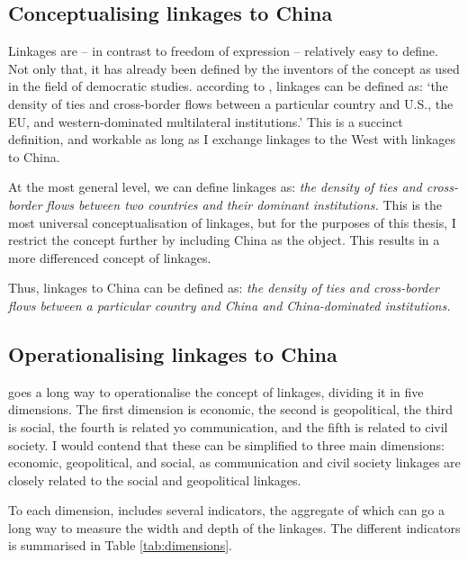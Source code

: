 \subsection{Conceptualising linkages to China}
Linkages are -- in contrast to freedom of expression -- relatively easy to define. Not only that, it has already been defined by the inventors of the concept as used in the field of democratic studies. according to \citet[pp. 383-384]{levitsky_linkage_2006}, linkages can be defined as: `the density of ties and cross-border flows between a particular country and U.S., the EU, and western-dominated multilateral institutions.' \citep[p. 383]{levitsky_linkage_2006} This is a succinct definition, and workable as long as I exchange linkages to the West with linkages to China. 

At the most general level, we can define linkages as: \textit{the density of ties and cross-border flows between two countries and their dominant institutions.} This is the most universal conceptualisation of linkages, but for the purposes of this thesis, I restrict the concept further by including China as the object. This results in a more differenced concept of linkages.

Thus, linkages to China can be defined as: \textit{the density of ties and cross-border flows between a particular country and China and China-dominated institutions.}

\subsection{Operationalising linkages to China} \label{sec:fbic}
\citet{levitsky_linkage_2006} goes a long way to operationalise the concept of linkages, dividing it in five dimensions. The first dimension is economic, the second is geopolitical, the third is social, the fourth is related yo communication, and the fifth is related to civil society. I would contend that these can be simplified to three main dimensions: economic, geopolitical, and social, as communication and civil society linkages are closely related to the social and geopolitical linkages. 

To each dimension, \citet{levitsky_linkage_2006} includes several indicators, the aggregate of which can go a long way to measure the width and depth of the linkages. The different indicators is summarised in Table \ref{tab:dimensions}. 

